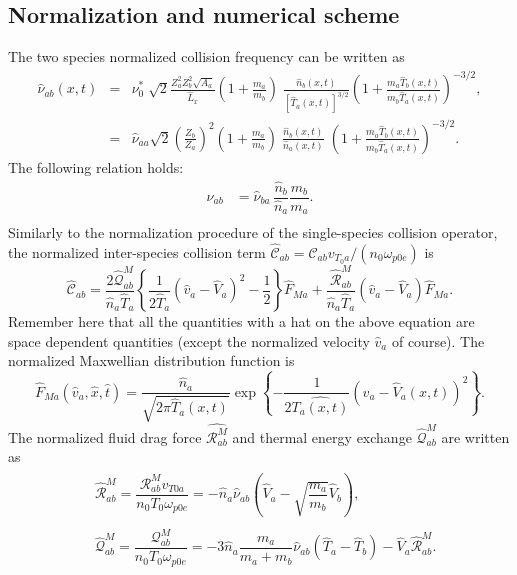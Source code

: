 \documentclass[11pt]{article}
\begin{document}
\subsection{Normalization and numerical scheme}
The two species normalized collision frequency can be written as
%
\begin{eqnarray}
	\hat\nu_{ab}(x,t) 
    &=& \nu^*_0\; \sqrt{2} \frac{Z_a^2Z_b^2 \sqrt{A_a}}{\hat L_x} \left(1+\frac{m_a}{m_b}\right)\; 
        \frac{\hat n_b(x,t)}{[\hat T_a(x,t)]^{3/2}} 
        \left(1+\frac{m_a\hat T_b(x,t)}{m_b \hat T_a(x,t)}\right)^{-3/2}, \nonumber\\
    &=&  \hat\nu_{aa} \sqrt{2}\left(\frac{Z_b}{Z_a}\right)^2
        \left(1+\frac{m_a}{m_b}\right)\; 
        \frac{\hat n_b(x,t)}{\hat n_a(x,t)}\;
        \left(1+\frac{m_a\hat T_b(x,t)}{m_b \hat T_a(x,t)}\right)^{-3/2}.
\end{eqnarray}
%
The following relation holds:
%
\begin{align}
  \hat{\nu}_{ab} & = \hat{\nu}_{ba} \, \dfrac{\hat{n}_b}{\hat{n}_a}   \dfrac{m_b}{m_a}. \\
\end{align}
%
Similarly to the normalization procedure of the single-species collision operator, the normalized inter-species collision term $\hat{\mathcal{C}}_{ab} = \mathcal{C}_{ab} v_{T_0a} / (n_0 \omega_{p0e})$ is 
%
\begin{equation}\label{eq:c_ab_nr}
  \hat{\mathcal{C}}_{ab} = \dfrac{2 \hat{\mathcal{Q}}_{ab}^{M}}{\hat{n}_a \hat{T}_a} \left\{ \dfrac{1}{2 \hat{T}_a} \left( \hat{v}_a - \hat{V}_a \right) ^2 - \dfrac{1}{2}  \right\} \hat{F}_{Ma} + \dfrac{\hat{\mathcal{R}}_{ab}^{M}}{\hat{n}_a \hat{T}_a} \left( \hat{v}_a - \hat{V}_{a} \right) \hat{F}_{Ma}.
\end{equation}
%
Remember here that all the quantities with a hat on the above equation are space dependent quantities (except the normalized velocity $\hat{v}_a$ of course). The normalized Maxwellian distribution function is
%
\begin{equation}\label{eq:nmz_max}
  \hat{F}_{Ma}(\hat{v}_a, \hat{x}, \hat{t}) = \dfrac{\hat{n}_a}{\sqrt{  2\pi \hat{T}_a(x,t) }} \operatorname{exp} \left\{- \dfrac{1}{2\hat{ T_a(x,t)}}(\hat{v}_a - \hat{V}_{a}(x,t))^2 \right\}.
\end{equation}
%
The normalized fluid drag force $\hat{\mathcal{R}_{ab}^{M}}$ and thermal energy exchange $\hat{\mathcal{Q}}_{ab}^{M}$ are written as 
%
  \begin{align}
 & \begin{aligned}
    \hat{\mathcal{R}}_{ab}^{M} = \dfrac{\mathcal{R}_{ab}^{M} v_{T 0 a}}{n_0 T_0 \omega_{p 0e}} = - \hat{n}_a \hat{\nu}_{ab} \left( \hat{V}_a - \sqrt{\dfrac{m_a}{m_b}} \hat{V}_b  \right),
\end{aligned}\\
 & \begin{aligned}
   \hat{\mathcal{Q}}_{ab}^{M} = \dfrac{\mathcal{Q}_{ab}^{M}}{n_0 T_0 \omega_{p 0e}} = - 3 \hat{n}_a \dfrac{m_a}{m_a + m_b} \hat{\nu}_{ab} \left( \hat{T}_a - \hat{T}_b \right) - \hat{V}_a \hat{\mathcal{R}}_{ab}^{M}.
 \end{aligned}
  \end{align}
\end{document}

